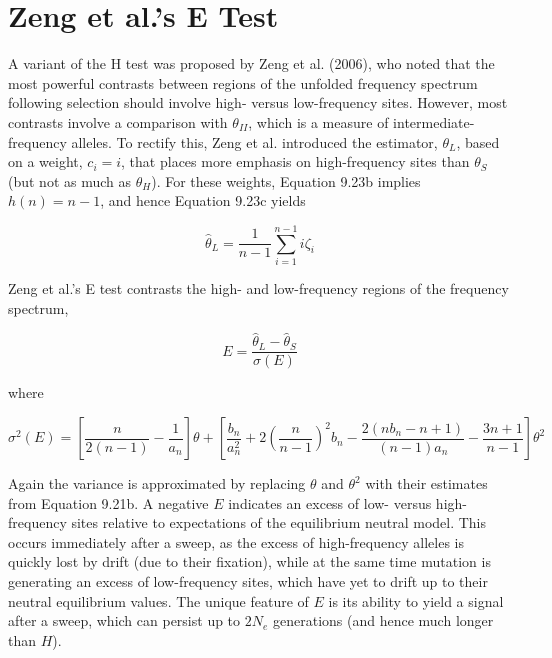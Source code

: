 \documentclass{article}
\begin{document}
\section{Zeng et al.'s E Test}
A variant of the H test was proposed by Zeng et al. (2006), who noted that the most powerful contrasts between regions of the unfolded frequency spectrum following selection should involve high- versus low-frequency sites. However, most contrasts involve a comparison with  $ \theta_{II} $, which is a measure of intermediate-frequency alleles. To rectify this, Zeng et al. introduced the estimator,  $ \theta_L $, based on a weight,  $ c_i = i $, that places more emphasis on high-frequency sites than  $ \theta_S $ (but not as much as  $ \theta_H $). For these weights, Equation 9.23b implies  $ h(n) = n - 1 $, and hence Equation 9.23c yields

\begin{equation}
\widehat{\theta}_{L}=\frac{1}{n-1}\sum_{i=1}^{n-1}i\zeta_{i}
\tag{9.28a}
\label{eq:9_28a}
\end{equation}

Zeng et al.'s E test contrasts the high- and low-frequency regions of the frequency spectrum,

\begin{equation}
E=\frac{\widehat{\theta}_{L}-\widehat{\theta}_{S}}{\sigma(E)}
\tag{9.28b}
\label{eq:9_28b}
\end{equation}

where

\begin{equation}
\sigma^{2}(E)=\left[\frac{n}{2(n-1)}-\frac{1}{a_{n}}\right]\theta+\left[\frac{b_{n}}{a_{n}^{2}}+2\left(\frac{n}{n-1}\right)^{2}b_{n}-\frac{2(n b_{n}-n+1)}{(n-1)a_{n}}-\frac{3n+1}{n-1}\right]\theta^{2}
\tag{9.28c}
\label{eq:9_28c}
\end{equation}

Again the variance is approximated by replacing  $ \theta $ and  $ \theta^2 $ with their estimates from Equation 9.21b. A negative  $ E $ indicates an excess of low- versus high-frequency sites relative to expectations of the equilibrium neutral model. This occurs immediately after a sweep, as the excess of high-frequency alleles is quickly lost by drift (due to their fixation), while at the same time mutation is generating an excess of low-frequency sites, which have yet to drift up to their neutral equilibrium values. The unique feature of  $ E $ is its ability to yield a signal after a sweep, which can persist up to  $ 2N_e $ generations (and hence much longer than  $ H $).
\end{document}
